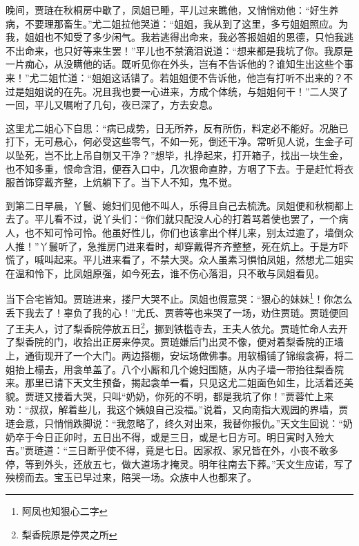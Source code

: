 \documentclass[12pt,oneside]{book}
\begin{document}
晚间，贾琏在秋桐房中歇了，凤姐已睡，平儿过来瞧他，又悄悄劝他：“好生养病，不要理那畜生。”尤二姐拉他哭道：“姐姐，我从到了这里，多亏姐姐照应。为我，姐姐也不知受了多少闲气。我若逃得出命来，我必答报姐姐的恩德，只怕我逃不出命来，也只好等来生罢！”平儿也不禁滴泪说道：“想来都是我坑了你。我原是一片痴心，从没瞒他的话。既听见你在外头，岂有不告诉他的？谁知生出这些个事来！”尤二姐忙道：“姐姐这话错了。若姐姐便不告诉他，他岂有打听不出来的？不过是姐姐说的在先。况且我也要一心进来，方成个体统，与姐姐何干！”二人哭了一回，平儿又嘱咐了几句，夜已深了，方去安息。

这里尤二姐心下自思：“病已成势，日无所养，反有所伤，料定必不能好。况胎已打下，无可悬心，何必受这些零气，不如一死，倒还干净。常听见人说，生金子可以坠死，岂不比上吊自刎又干净？”想毕，扎挣起来，打开箱子，找出一块生金，也不知多重，恨命含泪，便吞入口中，几次狠命直脖，方咽了下去。于是赶忙将衣服首饰穿戴齐整，上炕躺下了。当下人不知，鬼不觉。

到第二日早晨，丫鬟、媳妇们见他不叫人，乐得且自己去梳洗。凤姐便和秋桐都上去了。平儿看不过，说丫头们：“你们就只配没人心的打着骂着使也罢了，一个病人，也不知可怜可怜。他虽好性儿，你们也该拿出个样儿来，别太过逾了，墙倒众人推！”丫鬟听了，急推房门进来看时，却穿戴得齐齐整整，死在炕上。于是方吓慌了，喊叫起来。平儿进来看了，不禁大哭。众人虽素习惧怕凤姐，然想尤二姐实在温和怜下，比凤姐原强，如今死去，谁不伤心落泪，只不敢与凤姐看见。

当下合宅皆知。贾琏进来，搂尸大哭不止。凤姐也假意哭：“狠心的妹妹\footnote{阿凤也知狠心二字}！你怎么丢下我去了！辜负了我的心！”尤氏、贾蓉等也来哭了一场，劝住贾琏。贾琏便回了王夫人，讨了梨香院停放五日\footnote{梨香院原是停灵之所}，挪到铁槛寺去，王夫人依允。贾琏忙命人去开了梨香院的门，收拾出正房来停灵。贾琏嫌后门出灵不像，便对着梨香院的正墙上，通街现开了一个大门。两边搭棚，安坛场做佛事。用软榻铺了锦缎衾褥，将二姐抬上榻去，用衾单盖了。八个小厮和几个媳妇围随，从内子墙一带抬往梨香院来。那里已请下天文生预备，揭起衾单一看，只见这尤二姐面色如生，比活着还美貌。贾琏又搂着大哭，只叫“奶奶，你死的不明，都是我坑了你！”贾蓉忙上来劝：“叔叔，解着些儿，我这个姨娘自己没福。”说着，又向南指大观园的界墙，贾琏会意，只悄悄跌脚说：“我忽略了，终久对出来，我替你报仇。”天文生回说：“奶奶卒于今日正卯时，五日出不得，或是三日，或是七日方可。明日寅时入殓大吉。”贾琏道：“三日断乎使不得，竟是七日。因家叔、家兄皆在外，小丧不敢多停，等到外头，还放五七，做大道场才掩灵。明年往南去下葬。”天文生应诺，写了殃榜而去。宝玉已早过来，陪哭一场。众族中人也都来了。
\end{document}
